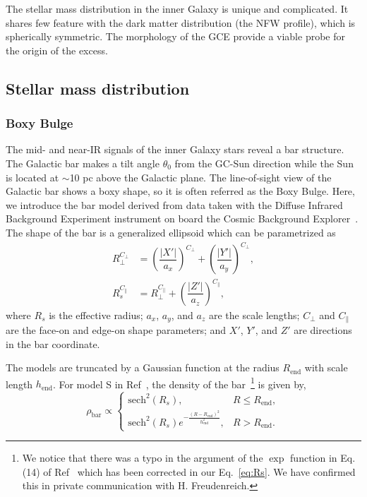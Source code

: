 \documentclass[doublespace,nopageskip]{VTthesis} %
\begin{document}

The stellar mass distribution in the inner Galaxy is unique and complicated. It shares few feature with the dark matter distribution (the NFW profile), which is spherically symmetric. The morphology of the GCE provide a viable probe for the origin of the excess.

\subsection{Stellar mass distribution}\label{se:bulge_model}

\subsubsection{Boxy Bulge}

The mid- and near-IR signals of the inner Galaxy stars reveal a bar structure. The Galactic bar makes a tilt angle $\theta_0$ from the GC-Sun direction while the Sun is located at $\sim$10 pc above the Galactic plane. The line-of-sight view of the Galactic bar shows a boxy shape, so it is often referred as the Boxy Bulge. Here, we introduce the bar model derived from data taken with the Diffuse Infrared Background Experiment instrument on board the Cosmic Background Explorer~\cite{1998ApJ...492..495F}. The shape of the bar is a generalized ellipsoid which can be parametrized as
\begin{align}\label{eq:Rs}
  R_{\perp}^{C_{\perp}} &= \left(\dfrac{|X'|}{a_x}\right)^{C_{\perp}} + \left(\dfrac{|Y'|}{a_y}\right)^{C_{\perp}},\\
  R_s^{C_{\parallel}} &= R_{\perp}^{C_{\parallel}} + \left(\dfrac{|Z'|}{a_z}\right)^{C_{\parallel}},
\end{align}
where $R_s$ is the effective radius; $a_x$, $a_y$, and $a_z$ are the scale lengths; $C_\perp$ and $C_\parallel$ are the face-on and edge-on shape parameters; and $X'$, $Y'$, and $Z'$
are directions in the bar
coordinate. 

The models are truncated by a Gaussian function at the
radius $R_{\text{end}}$ with scale length $h_{\text{end}}$. For model S in Ref~\cite{1998ApJ...492..495F}, the density of the bar~\footnote{We notice that there was a typo in the argument of the $\exp$ function in Eq.(14) of Ref~\cite{1998ApJ...492..495F} which has been corrected in our Eq.~\ref{eq:Rs}. We have confirmed this in private communication with H. Freudenreich.} is given by,
\begin{equation}\label{eq:rhobar}
  \rho_{\text{bar}}\propto \begin{cases}
    \text{sech}^2(R_s), & R \leq R_{\text{end}},\\
    \text{sech}^2(R_s)e^{-\frac{(R-R_{\text{end}})^2}{h_{\text{end}}^2}}, &   R > R_{\text{end}}.
  \end{cases}
\end{equation}
\end{document}
